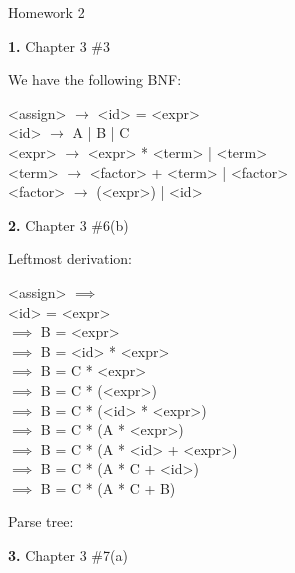 \documentclass[letterpaper, 11pt]{article}
\newcommand{\hwnumbersec}[2]{\medskip \noindent\textbf{#1.} Chapter 3 \##2 \smallskip}
\newcommand{\To}{$\rightarrow$ }
\begin{document}
\begin{center}
	{\LARGE Homework 2}\\
\end{center}

\hwnumbersec{1}{3}

We have the following BNF:
\medskip

\begin{minipage}{0.8\textwidth}
\centering
\begin{grammar}
	<assign> $\rightarrow$ <id> = <expr> \\
	<id> \To A | B | C \\
	<expr> \To <expr> * <term> | <term> \\
	<term> \To <factor> + <term> | <factor> \\ 
	<factor> \To (<expr>) | <id>
\end{grammar}
\end{minipage}

\hwnumbersec{2}{6(b)}

Leftmost derivation:
\medskip

\begin{minipage}{0.8\textwidth}
\centering
\begin{grammar}
	<assign> $\implies$\\
	<id> = <expr> \\
	$\implies$ B = <expr> \\
	$\implies$ B = <id> * <expr> \\
	$\implies$ B = C * <expr> \\
	$\implies$ B = C * (<expr>)\\
	$\implies$ B = C * (<id> * <expr>) \\
	$\implies$ B = C * (A * <expr>)\\
	$\implies$ B = C * (A * <id> + <expr>)\\
	$\implies$ B = C * (A * C + <id>)\\
	$\implies$ B = C * (A * C + B)
\end{grammar}
\end{minipage}

Parse tree:


\hwnumbersec{3}{7(a)}
\end{document}
